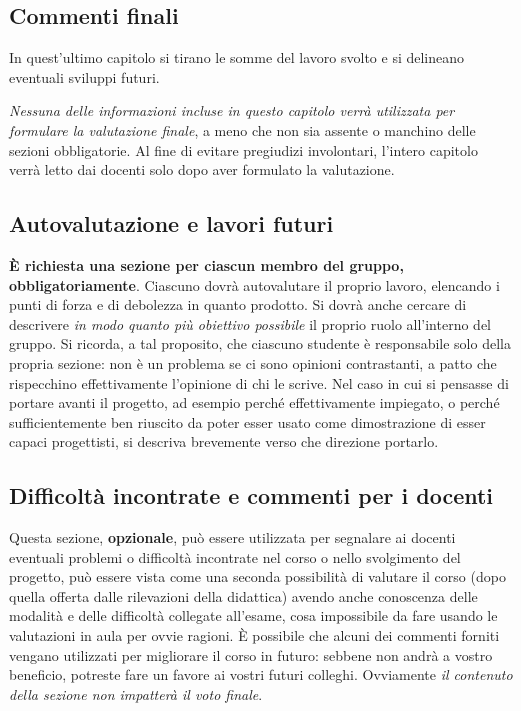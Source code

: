 \documentclass[a4paper,12pt]{report}
\begin{document}
\begin{itemize}
\chapter{Commenti finali}

In quest'ultimo capitolo si tirano le somme del lavoro svolto e si delineano eventuali sviluppi
futuri.

\textit{Nessuna delle informazioni incluse in questo capitolo verrà utilizzata per formulare la valutazione finale}, a meno che non sia assente o manchino delle sezioni obbligatorie.
%
Al fine di evitare pregiudizi involontari, l'intero capitolo verrà letto dai docenti solo dopo aver formulato la valutazione.

\section{Autovalutazione e lavori futuri}

\textbf{È richiesta una sezione per ciascun membro del gruppo, obbligatoriamente}.
%
Ciascuno dovrà autovalutare il proprio lavoro, elencando i punti di forza e di debolezza in quanto prodotto.
Si dovrà anche cercare di descrivere \emph{in modo quanto più obiettivo possibile} il proprio ruolo all'interno del gruppo.
Si ricorda, a tal proposito, che ciascuno studente è responsabile solo della propria sezione: non è un problema se ci sono opinioni contrastanti, a patto che rispecchino effettivamente l'opinione di chi le scrive.
Nel caso in cui si pensasse di portare avanti il progetto, ad esempio perché effettivamente impiegato, o perché sufficientemente ben riuscito da poter esser usato come dimostrazione di esser capaci progettisti, si descriva brevemente verso che direzione portarlo.

\section{Difficoltà incontrate e commenti per i docenti}

Questa sezione, \textbf{opzionale}, può essere utilizzata per segnalare ai docenti eventuali problemi o difficoltà incontrate nel corso o nello svolgimento del progetto, può essere vista come una seconda possibilità di valutare il corso (dopo quella offerta dalle rilevazioni della didattica) avendo anche conoscenza delle modalità e delle difficoltà collegate all'esame, cosa impossibile da fare usando le valutazioni in aula per ovvie ragioni.
%
È possibile che alcuni dei commenti forniti vengano utilizzati per migliorare il corso in futuro: sebbene non andrà a vostro beneficio, potreste fare un favore ai vostri futuri colleghi.
%
Ovviamente \textit{il contenuto della sezione non impatterà il voto finale}.


\end{itemize}
\end{document}
